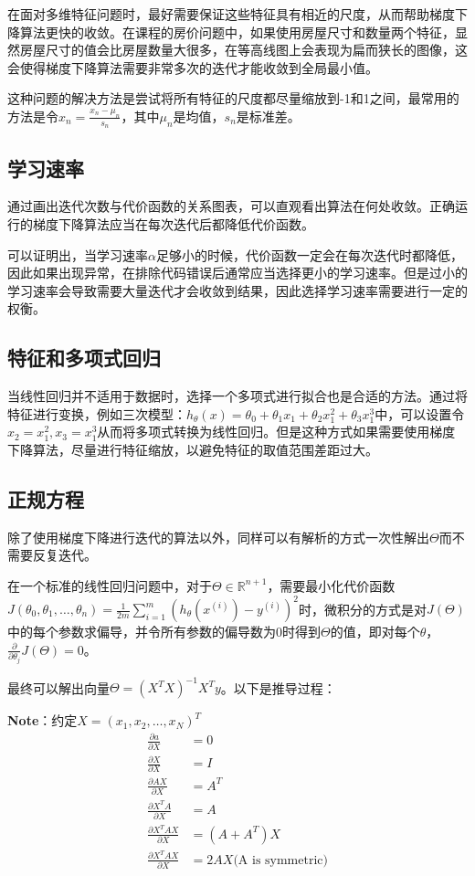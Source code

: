 \documentclass[12pt, a4paper]{article}
\begin{document}
在面对多维特征问题时，最好需要保证这些特征具有相近的尺度，从而帮助梯度下降算法更快的收敛。在课程的房价问题中，如果使用房屋尺寸和数量两个特征，显然房屋尺寸的值会比房屋数量大很多，在等高线图上会表现为扁而狭长的图像，这会使得梯度下降算法需要非常多次的迭代才能收敛到全局最小值。

这种问题的解决方法是尝试将所有特征的尺度都尽量缩放到-1和1之间，最常用的方法是令$x_n=\frac{x_n-\mu_n}{s_n}$，其中$\mu_n$是均值，$s_n$是标准差。

\subsection{学习速率}

通过画出迭代次数与代价函数的关系图表，可以直观看出算法在何处收敛。正确运行的梯度下降算法应当在每次迭代后都降低代价函数。

可以证明出，当学习速率$\alpha$足够小的时候，代价函数一定会在每次迭代时都降低，因此如果出现异常，在排除代码错误后通常应当选择更小的学习速率。但是过小的学习速率会导致需要大量迭代才会收敛到结果，因此选择学习速率需要进行一定的权衡。

\subsection{特征和多项式回归}

当线性回归并不适用于数据时，选择一个多项式进行拟合也是合适的方法。通过将特征进行变换，例如三次模型：$h_\theta(x)=\theta_0+\theta_1x_1+\theta_2x_1^2+\theta_3x_1^3$中，可以设置令$x_2=x_1^2,x_3=x_1^3$从而将多项式转换为线性回归。但是这种方式如果需要使用梯度下降算法，尽量进行特征缩放，以避免特征的取值范围差距过大。

\subsection{正规方程}

除了使用梯度下降进行迭代的算法以外，同样可以有解析的方式一次性解出$\Theta$而不需要反复迭代。

在一个标准的线性回归问题中，对于$\Theta\in\mathbb{R}^{n+1}$，需要最小化代价函数$J(\theta_0,\theta_1,\dots,\theta_n)=\frac{1}{2m}\sum_{i=1}^{m}(h_\theta(x^{(i)})-y^{(i)})^2$时，微积分的方式是对$J(\Theta)$中的每个参数求偏导，并令所有参数的偏导数为0时得到$\Theta$的值，即对每个$\theta$，$\frac{\partial}{\partial\theta_j}J(\Theta)=0$。

最终可以解出向量$\Theta=(X^TX)^{-1}X^Ty$。以下是推导过程：

\textbf{Note}：约定$X=(x_1, x_2,\dots,x_N)^T$
\begin{align*}
    \frac{\partial a}{\partial X}     & = 0                           \\
    \frac{\partial X}{\partial X}     & = I                           \\
    \frac{\partial AX}{\partial X}    & = A^T                         \\
    \frac{\partial X^TA}{\partial X}  & = A                           \\
    \frac{\partial X^TAX}{\partial X} & = (A+A^T)X                    \\
    \frac{\partial X^TAX}{\partial X} & = 2AX \text{(A is symmetric)}
\end{align*}
\end{document}
